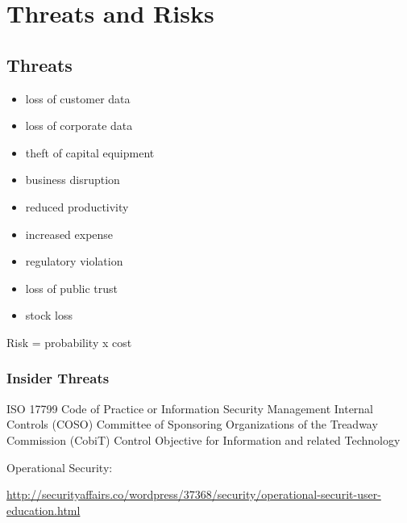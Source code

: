 \chapter{Threats and Risks}
\section{Threats}
\begin{itemize}
\item loss of customer data
\item loss of corporate data
\item theft of capital equipment
\item business disruption
\item reduced productivity
\item increased expense
\item regulatory violation
\item loss of public trust
\item stock loss
\end{itemize}

Risk = probability x cost

\subsection{Insider Threats}

ISO 17799 Code of Practice or Information Security Management
Internal Controls
  (COSO) Committee of Sponsoring Organizations of the Treadway Commission
  (CobiT) Control Objective for Information and related Technology

Operational Security:

\url{http://securityaffairs.co/wordpress/37368/security/operational-securit-user-education.html}

